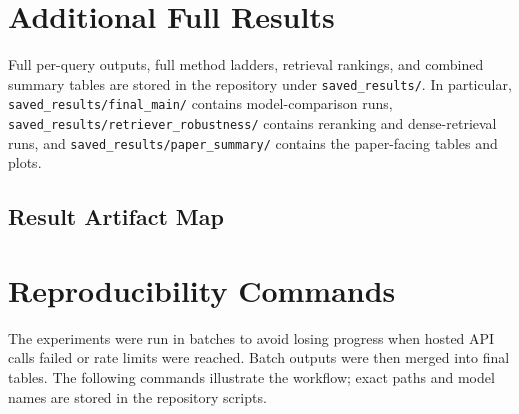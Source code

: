 \documentclass[11pt]{article}
\begin{document}
\section{Additional Full Results}

Full per-query outputs, full method ladders, retrieval rankings, and combined summary tables are stored in the repository under \texttt{saved\_results/}. In particular, \texttt{saved\_results/final\_main/} contains model-comparison runs, \texttt{saved\_results/retriever\_robustness/} contains reranking and dense-retrieval runs, and \texttt{saved\_results/paper\_summary/} contains the paper-facing tables and plots.

\subsection{Result Artifact Map}

\begin{table}[H]
\centering
\small
\caption{Main result artifact locations.}
\label{tab:artifact_map}
\end{table}

\section{Reproducibility Commands}

The experiments were run in batches to avoid losing progress when hosted API calls failed or rate limits were reached. Batch outputs were then merged into final tables. The following commands illustrate the workflow; exact paths and model names are stored in the repository scripts.
\end{document}

